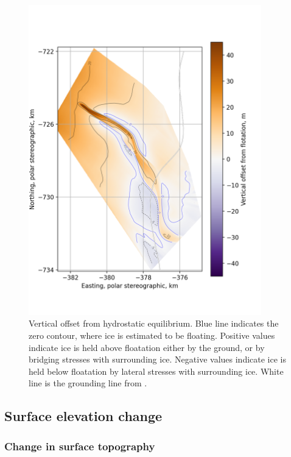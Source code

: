 \begin{figure}[!ht]
\centering
\includegraphics[width=0.9\textwidth]{chapters/2/where_float.png}
\caption[Hydrostatic Equilibrium]{Vertical offset from hydrostatic equilibrium. Blue line indicates the zero contour, where ice is estimated to be floating. Positive values indicate ice is held above floatation either by the ground, or by bridging stresses with surrounding ice. Negative values indicate ice is held below floatation by lateral stresses with surrounding ice.  White line is the grounding line from \cite{depoorter2013amii}. }
\label{fig:bridging}
\end{figure} 

\subsection{Surface elevation change } \label{sec:changeintopog}

\subsubsection{Change in surface topography} \label{sec:changeinsurf}


